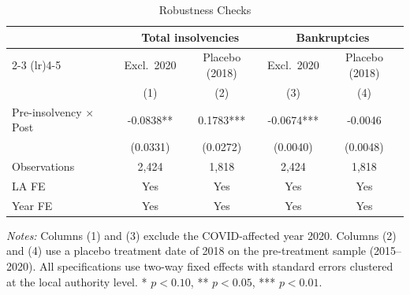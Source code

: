 \begin{table}[htbp]
\centering
\caption{Robustness Checks}
\label{tab:robustness}
\begin{tabular}{lcccc}
\hline\hline
 & \multicolumn{2}{c}{Total insolvencies} & \multicolumn{2}{c}{Bankruptcies} \\
\cmidrule(lr){2-3} \cmidrule(lr){4-5}
 & Excl.~2020 & Placebo (2018) & Excl.~2020 & Placebo (2018) \\
 & (1) & (2) & (3) & (4) \\
\hline
Pre-insolvency $\times$ Post & -0.0838** & 0.1783*** & -0.0674*** & -0.0046 \\
 & (0.0331) & (0.0272) & (0.0040) & (0.0048) \\
\addlinespace
Observations & 2,424 & 1,818 & 2,424 & 1,818 \\
LA FE & Yes & Yes & Yes & Yes \\
Year FE & Yes & Yes & Yes & Yes \\
\hline\hline
\end{tabular}
\par\vspace{0.3em}
{\footnotesize \textit{Notes:} Columns (1) and (3) exclude the COVID-affected year 2020. Columns (2) and (4) use a placebo treatment date of 2018 on the pre-treatment sample (2015--2020). All specifications use two-way fixed effects with standard errors clustered at the local authority level. * $p<0.10$, ** $p<0.05$, *** $p<0.01$.}
\end{table}

